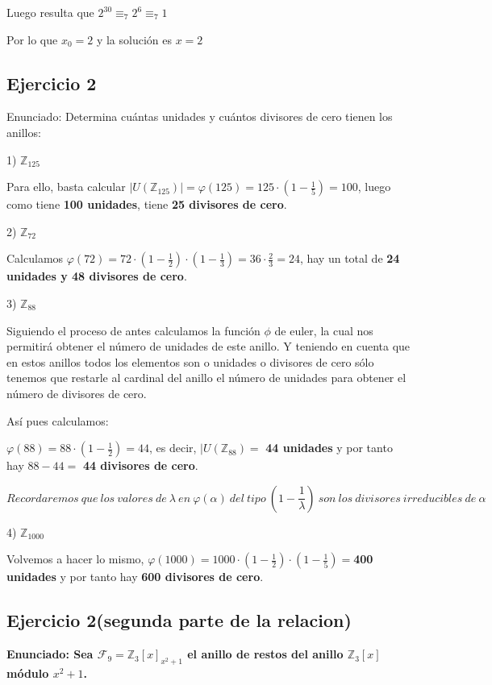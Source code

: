 \documentclass[11pt, a4paper, titlepage]{article}
\providecommand{\ent}{\mathbb{Z}}
\begin{document}
Luego resulta que $2^{30}\equiv_7 2^6 \equiv_7 1$

Por lo que $x_0 = 2$ y la solución es $x=2$


\subsection{\LARGE{Ejercicio 2}}

Enunciado: Determina cuántas unidades y cuántos divisores de cero tienen los anillos:

1) $\ent_{125}$

Para ello, basta calcular $|U(\ent_{125})| = \varphi(125) = 125 \cdot(1-\frac{1}{5}) = 100$, luego como tiene \textbf{100 unidades}, tiene \textbf{25 divisores de cero}.

2) $\ent_{72}$

Calculamos $\varphi(72) = 72\cdot(1-\frac{1}{2})\cdot(1-\frac{1}{3}) = 36\cdot \frac{2}{3} = 24$, hay un total de \textbf{24 unidades y 48 divisores de cero}.


3) $\ent_{88}$

Siguiendo el proceso de antes calculamos la función $\phi$ de euler, la cual nos permitirá obtener el número de unidades de este anillo.
Y teniendo en cuenta que en estos anillos todos los elementos son o unidades o divisores de cero sólo tenemos que restarle al cardinal del anillo el número de unidades para obtener el número de divisores de cero.

Así pues calculamos:

$\varphi(88) = 88\cdot(1-\frac{1}{2}) = 44$, es decir, $|U(\ent_{88}) =$ \textbf{44 unidades} y por tanto hay $88-44=$ \textbf{44 divisores de cero}.

$$Recordaremos\ que\ los\ valores\ de\ \lambda\ en\ \varphi(\alpha)\ del\ tipo\ (1-\frac{1}{\lambda})\ son\ los\ divisores\ irreducibles\ de\ \alpha$$


4) $\ent_{1000}$

Volvemos a hacer lo mismo, $\varphi(1000) = 1000\cdot(1-\frac{1}{2})\cdot(1-\frac{1}{5}) = $\textbf{400 unidades} y por tanto hay \textbf{600 divisores de cero}.


\subsection{\LARGE{Ejercicio 2(segunda parte de la relacion)}} 

\textbf{Enunciado: Sea $\mathcal{F}_9 = \ent_3[x]_{ x^2 +1}$ el anillo de restos del anillo $\ent_3[x]$ módulo $x^2 +1$.}
\end{document}

